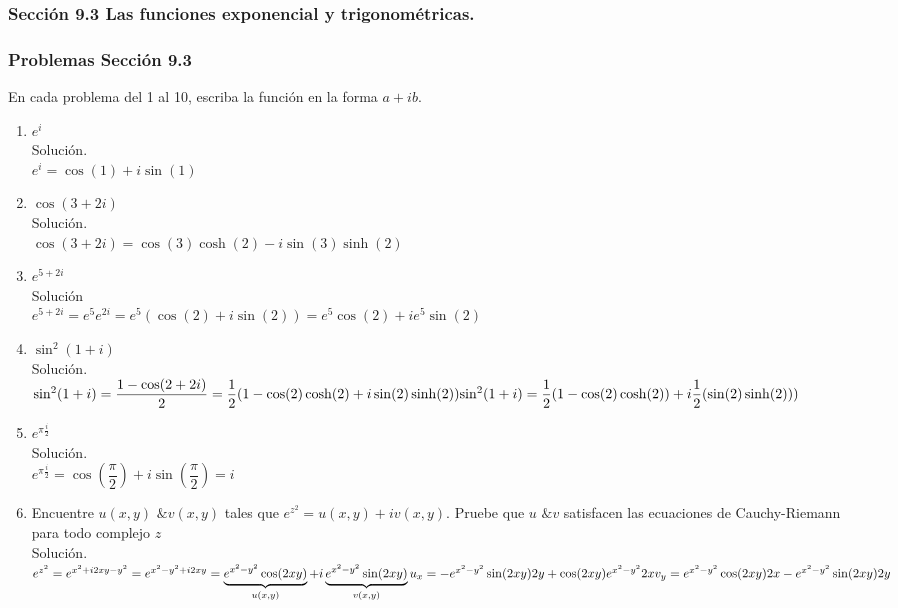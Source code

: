 
\subsubsection* {Secci\'on 9.3 Las funciones exponencial y trigonom\'etricas.}
	\subsubsection* {Problemas Secci\'on 9.3}
\justify
En cada problema del 1 al 10, escriba la funci\'on en la forma $a+ib$.\\
\begin{enumerate}

\item $e^i$ \\
Soluci\'on.\\
$e^i = \cos(1)+i\sin(1)$\\
\item $\cos(3+2i)$\\
Soluci\'on.\\
$\cos(3+2i) = \cos(3)\cosh(2)-i\sin(3)\sinh(2)$
\item $e^{5+2i}$\\
Soluci\'on\\
$e^{5+2i} = e^5e^{2i} = e^5(\cos(2)+i\sin(2)) = e^5\cos(2)+ie^5\sin(2)$

\item ${\sin}^{2}(1+i)$\\
Soluci\'on.\\
$ {\sin}^{2}(1+i) = \dfrac{1 - \cos(2+2i)}{2}
= \dfrac{1}{2}(1 - \cos(2)\cosh(2) + i\sin(2)\sinh(2)) \\
{\sin}^{2}(1+i) = \dfrac{1}{2}(1 - \cos(2)\cosh(2)) + i\dfrac{1}{2}(\sin(2)\sinh(2)) )$

\item $ {e}^{\pi \frac{i}{2}} $\\
Soluci\'on.\\
${e}^{\pi \frac{i}{2}} = \cos(\dfrac{\pi}{2}) + i\sin(\dfrac{\pi}{2}) = i $

\item Encuentre $u(x, y) \text{ \& } v(x,y)$ tales que $ {e}^{{z}^{2}} = u(x, y) + iv(x, y)$. Pruebe que $u \text{ \& } v$ satisfacen las ecuaciones de Cauchy-Riemann para todo complejo $ z $\\
Soluci\'on.\\
${e}^{z^2} = {e}^{x^2+i2xy-y^2} = {e}^{x^2-y^2+i2xy} = \underbrace{e^{x^2-y^2}\cos(2xy)}_{u(x, y)} + i\underbrace{e^{x^2-y^2}\sin(2xy)}_{v(x, y)} \\
u_{x} = -e^{x^2-y^2}\sin(2xy)2y + \cos(2xy)e^{x^2-y^2}2x \\
v_{y} = e^{x^2-y^2}\cos(2xy)2x -e^{x^2-y^2}\sin(2xy)2y$


\end{enumerate}
